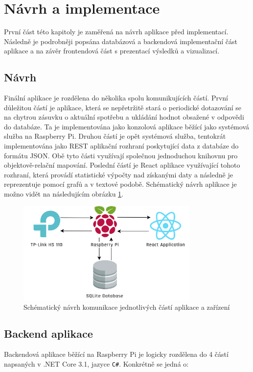 \documentclass[czech,master,dept460,male,cpp,cpdeclaration,oneside]{diploma}
\begin{document}
\clearpage

\section{Návrh a implementace}
První část této kapitoly je zaměřená na návrh aplikace před implementací. Následně je podrobněji popsána databázová a backendová implementační část aplikace a na závěr frontendová část s prezentací výsledků a vizualizací.

\subsection{Návrh}
Finální aplikace je rozdělena do několika spolu komunikujících částí. První důležitou částí je aplikace, která se nepřetržitě stará o periodické dotazování se na chytrou zásuvku o aktuální spotřebu a ukládání hodnot obsažené v odpovědi do databáze. Ta je implementována jako konzolová aplikace běžící jako systémová služba na Raspberry Pi. Druhou částí je opět systémová služba, tentokrát implementována jako REST aplikační rozhraní poskytující data z databáze do formátu JSON. Obě tyto části využívají společnou jednoduchou knihovnu pro objektově-relační mapování. Poslední částí je React aplikace využívající tohoto rozhraní, která provádí statistické výpočty nad získanými daty a následně je reprezentuje pomocí grafů a v textové podobě. Schématický návrh aplikace je možno vidět na následujícím obrázku \ref{fig:AppDesign}.

\bigbreak

\begin{figure}[h!]
	\centering
	\includegraphics[width=0.8\textwidth]{Figures/AppDesign.png}
	\caption{Schématický návrh komunikace jednotlivých částí aplikace a zařízení}
	\label{fig:AppDesign}
\end{figure}

\clearpage

\subsection{Backend aplikace}
Backendová aplikace běžící na Raspberry Pi je logicky rozdělena do 4 částí napsaných v .NET Core 3.1, jazyce \texttt{C\#}. Konkrétně se jedná o:
\end{document}
